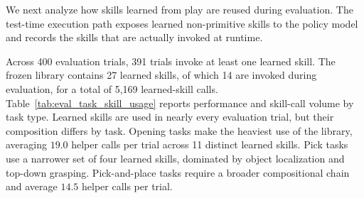 We next analyze how skills learned from play are reused during evaluation. The test-time execution path
exposes learned non-primitive skills to the policy model and records the
skills that are actually invoked at runtime.

Across 400 evaluation trials, 391 trials invoke at least one learned skill.
The frozen library contains 27 learned skills, of which 14 are invoked during
evaluation, for a total of 5,169 learned-skill calls. Table~\ref{tab:eval_task_skill_usage}
reports performance and skill-call volume by task type. Learned skills are
used in nearly every evaluation trial, but their composition differs by task.
Opening tasks make the heaviest use of the library, averaging $19.0$ helper
calls per trial across 11 distinct learned skills. Pick tasks use a narrower
set of four learned skills, dominated by object localization and top-down grasping.
Pick-and-place tasks require a broader compositional chain and average $14.5$
helper calls per trial.





